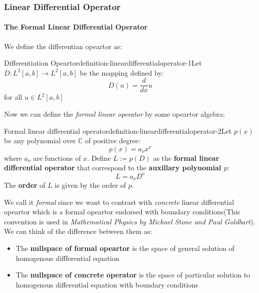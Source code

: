 \subsubsection{Linear Differential Operator}

\paragraph{The Formal Linear Differential Operator}

We define the differentian opeartor as:

\begin{mystthmdefinition}{Differentiation Opeartor}{definition-lineardifferentialoperator-1}Let $D:L^2[a,b]\to L^2[a,b]$ be the mapping defined by:
\begin{equation}
D(u)=\frac{d}{dx}u
\end{equation}
for all $u\in L^2[a,b]$

\end{mystthmdefinition}
Now we can define the \textit{formal linear operator} by some opeartor algebra:

\begin{mystthmdefinition}{Formal linear differential operator}{definition-lineardifferentialoperator-2}Let $p(x)$ be any polynomial over $\mathbb{C}$ of positive degree:
\begin{equation}
p(x)=a_\nu x^\nu
\end{equation}
where $a_{\nu}$ are functions of $x$. Define $L:=p(D)$ as the \textbf{formal linear differential operator} that correspond to the \textbf{auxillary polynomial $p$}:
\begin{equation}
L=a_\nu D^{\nu}
\end{equation}
The \textbf{order} of $L$ is given by the order of $p$.

\end{mystthmdefinition}
We call it \textit{formal} since we want to contrast with \textit{concrete} linear differential opeartor which is a formal opeartor endorsed with boundary conditions(This convention is used in \textit{Mathematical Physics by Michael Stone and Paul Goldbart}). We can think of the difference between them as:

\begin{itemize}
\item The \textbf{nullspace of formal opeartor} is the space of general solution of homogenous diffferential equation
\item The \textbf{nullspace of concrete operator} is the space of particular solution to homogenous differential equation with boundary conditions
\end{itemize}


